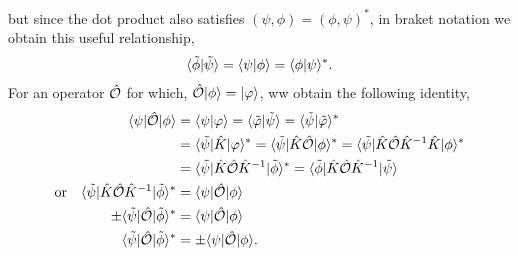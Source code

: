 \documentclass[floatfix,prb,aps,superscriptaddress,11pt]{revtex4}
\begin{document}
but since the dot product also satisfies $(\psi,\phi) =(\phi,\psi)^*$,
in braket notation we obtain this useful relationship, 
\begin{align}\label{z.6a}
\langle {\tilde\phi} | {\tilde\psi} \rangle
=
\langle {\psi} | {\phi} \rangle
=
\langle {\phi} | {\psi} \rangle^*
.  
\end{align} 
For an operator $\hat{{\cal O}}$ 
for which, 
$\hat{{\cal O}}| \phi \rangle=| \varphi \rangle$, ww obtain the following identity,
\begin{align}\label{z.6}
\langle \psi |\hat{{\cal O}}| \phi \rangle
&=
\langle {\psi} | {\varphi} \rangle
=
\langle {\tilde\varphi} | {\tilde\psi} \rangle
=
\langle {\tilde\psi} | {\tilde\varphi} \rangle^*
\nonumber\\
&
=
\langle \tilde\psi |\hat K| \varphi \rangle^*
=
\langle \tilde\psi |\hat K\hat{{\cal O}}| \phi \rangle^*
=
\langle \tilde\psi |\hat K\hat{{\cal O}}\hat K^{-1}\hat K| \phi \rangle^*
\nonumber\\
&=
\langle \tilde\psi |\hat K\hat{{\cal O}}\hat K^{-1}| \tilde\phi \rangle^* 
=
\langle \tilde\phi |\hat K\hat{{\cal O}}\hat K^{-1}| \tilde\psi \rangle
\nonumber\\
\mathrm{or}\quad 
\langle \tilde\psi |\hat K\hat{{\cal O}}\hat K^{-1}| \tilde\phi \rangle^* 
&=
\langle \psi |\hat{{\cal O}}| \phi \rangle
\nonumber\\
\pm\langle \tilde\psi |\hat{{\cal O}}| \tilde\phi \rangle^* 
&=
\langle \psi |\hat{{\cal O}}| \phi \rangle
\nonumber\\
\langle \tilde\psi |\hat{{\cal O}}| \tilde\phi \rangle^* 
&=
\pm\langle \psi |\hat{{\cal O}}| \phi \rangle
. 
\end{align}
 
\end{document}
